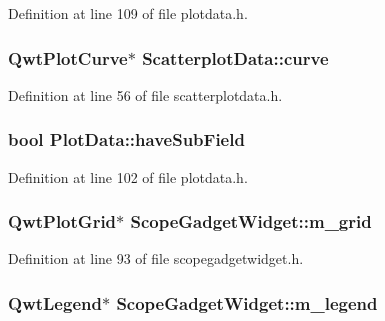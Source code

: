 \-Definition at line 109 of file plotdata.\-h.

\hypertarget{group___scope_plugin_ga4a0647f875271067323cf2ad3868afa4}{
\subsubsection[{curve}]{\setlength{\rightskip}{0pt plus 5cm}\-Qwt\-Plot\-Curve$\ast$ {\bf \-Scatterplot\-Data\-::curve}}}\label{group___scope_plugin_ga4a0647f875271067323cf2ad3868afa4}


\-Definition at line 56 of file scatterplotdata.\-h.

\hypertarget{group___scope_plugin_ga75814d7f770a1a8348f39dc7ca4bdb8f}{
\subsubsection[{have\-Sub\-Field}]{\setlength{\rightskip}{0pt plus 5cm}bool {\bf \-Plot\-Data\-::have\-Sub\-Field}}}\label{group___scope_plugin_ga75814d7f770a1a8348f39dc7ca4bdb8f}


\-Definition at line 102 of file plotdata.\-h.

\hypertarget{group___scope_plugin_gaccb00d0e9720797980ac9f03c545e756}{
\subsubsection[{m\-\_\-grid}]{\setlength{\rightskip}{0pt plus 5cm}\-Qwt\-Plot\-Grid$\ast$ {\bf \-Scope\-Gadget\-Widget\-::m\-\_\-grid}}}\label{group___scope_plugin_gaccb00d0e9720797980ac9f03c545e756}


\-Definition at line 93 of file scopegadgetwidget.\-h.

\hypertarget{group___scope_plugin_ga2ee6ef41538d48a8d6f653765bcb80a6}{
\subsubsection[{m\-\_\-legend}]{\setlength{\rightskip}{0pt plus 5cm}\-Qwt\-Legend$\ast$ {\bf \-Scope\-Gadget\-Widget\-::m\-\_\-legend}}}\label{group___scope_plugin_ga2ee6ef41538d48a8d6f653765bcb80a6}


